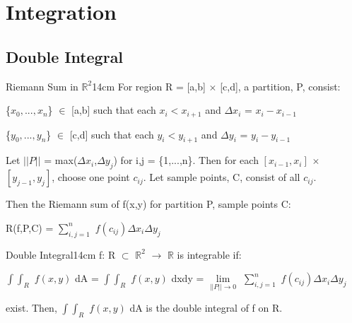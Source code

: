 \newpage

\section[Day 5: Integration]{ Integration }

\subsection{ Double Integral }

    \begin{definition}{Riemann Sum in $\mathbb{R}^2$}{14cm}
        For region R = [a,b] $\times$ [c,d], a {\color{lblue} partition}, P,
        consist:
        
        \hspace{0.5cm}
        \{$x_0,...,x_n$\} $\in$ [a,b] such that each $x_i < x_{i+1}$
        and $\Delta x_i$ = $x_i - x_{i-1}$
        
        \hspace{0.5cm}
        \{$y_0,...,y_n$\} $\in$ [c,d] such that each $y_i < y_{i+1}$
        and $\Delta y_i$ = $y_i - y_{i-1}$

        Let $||P||$ = max($\Delta x_i$,$\Delta y_j$) for i,j = \{1,...,n\}.
        Then for each $[x_{i-1},x_i]$ $\times$ $[y_{j-1},y_j]$,
        choose one point $c_{ij}$.
        Let {\color{lblue} sample points}, C, consist of all $c_{ij}$.

        Then the {\color{lblue} Riemann sum} of f(x,y) for partition P,
        sample points C:

        \hspace{0.5cm}
        R(f,P,C) = $\sum_{i,j=1}^n$ $f(c_{ij}) \Delta x_i \Delta y_j$
    \end{definition}

    \vspace{0.5cm}



    \begin{definition}{Double Integral}{14cm}
        f: R $\subset$ $\mathbb{R}^2$ $\rightarrow$ $\mathbb{R}$
        is {\color{lblue} integrable} if:

        \hspace{0.5cm}
        $\int \int_R$ $f(x,y)$ dA
        = $\int \int_R$ $f(x,y)$ dxdy
        = $\underset{||P|| \rightarrow 0}{\lim}$
            $\sum_{i,j=1}^n$ $f(c_{ij}) \Delta x_i \Delta y_j$

        exist. Then, $\int \int_R$ $f(x,y)$ dA
        is the {\color{lblue} double integral} of f on R.
    \end{definition}

